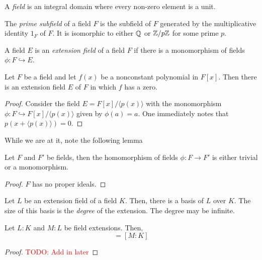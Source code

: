 \begin{definition}[Field]
    A \textit{field} is an integral domain where every non-zero element is a unit.
\end{definition}

\begin{definition}
    The \textit{prime subfield} of a field $F$ is the subfield of $F$ generated by the multiplicative identity $1_F$ of $F$. It is isomorphic to either $\mathbb{Q}$ or $\mathbb{Z}/p\mathbb{Z}$ for some prime $p$.
\end{definition}

\begin{definition}
    A field $E$ is an \textit{extension field} of a field $F$ if there is a monomorphism of fields $\phi:F\hookrightarrow E$.
\end{definition}

\begin{theorem}
    Let $F$ be a field and let $f(x)$ be a nonconstant polynomial in $F[x]$. Then there is an extension field $E$ of $F$ in which $f$ has a zero.
\end{theorem}
\begin{proof}
    Consider the field $E = F[x]/\langle p(x)\rangle$ with the monomorphism $\phi:F\hookrightarrow F[x]/\langle p(x)\rangle$ given by $\phi(a) = a$. One immediately notes that $p(x + \langle p(x)\rangle) = 0$.
\end{proof}

While we are at it, note the following lemma
\begin{lemma}
    Let $F$ and $F'$ be fields, then the homomorphism of fields $\phi:F\to F'$ is either trivial or a monomorphism.
\end{lemma}
\begin{proof}
    $F$ has no proper ideals.
\end{proof}

\begin{definition}
    Let $L$ be an extension field of a field $K$. Then, there is a basis of $L$ over $K$. The size of this basis is the \textit{degree} of the extension. The degree may be infinite.
\end{definition}

\begin{theorem}
    Let $L:K$ and $M:L$ be field extensions. Then, 
    \begin{equation*}
        [M:L][L:K] = [M:K]
    \end{equation*}
\end{theorem}
\begin{proof}
    \textcolor{red}{TODO: Add in later}
\end{proof}

